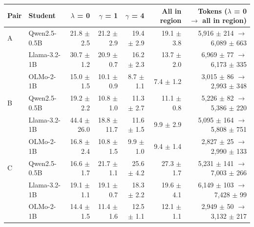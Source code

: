 \begin{tabular}{llrrrrr}
\toprule
Pair & Student & $\lambda$ = 0 & $\gamma$ = 1 & $\gamma$ = 4 & All in region & Tokens ($\lambda$ = 0 $\rightarrow$ all in region) \\
\midrule
A & Qwen2.5-0.5B & 21.8 $\pm$ 2.5 & 21.2 $\pm$ 2.9 & 19.4 $\pm$ 2.9 & 19.1 $\pm$ 3.8 & 5,916 $\pm$ 214 $\rightarrow$ 6,089 $\pm$ 663 \\
 & Llama-3.2-1B & 30.7 $\pm$ 1.2 & 20.9 $\pm$ 0.7 & 16.2 $\pm$ 2.3 & 13.7 $\pm$ 2.0 & 6,969 $\pm$ 77 $\rightarrow$ 6,173 $\pm$ 335 \\
 & OLMo-2-1B & 15.0 $\pm$ 1.5 & 10.1 $\pm$ 0.9 & 8.7 $\pm$ 1.1 & 7.4 $\pm$ 1.2 & 3,015 $\pm$ 86 $\rightarrow$ 2,993 $\pm$ 348 \\
\midrule
B & Qwen2.5-0.5B & 19.2 $\pm$ 2.2 & 10.8 $\pm$ 1.0 & 11.3 $\pm$ 2.7 & 11.1 $\pm$ 0.8 & 5,226 $\pm$ 82 $\rightarrow$ 5,386 $\pm$ 220 \\
 & Llama-3.2-1B & 44.4 $\pm$ 26.0 & 18.8 $\pm$ 11.7 & 11.6 $\pm$ 1.5 & 9.9 $\pm$ 2.9 & 5,095 $\pm$ 164 $\rightarrow$ 5,808 $\pm$ 751 \\
 & OLMo-2-1B & 16.8 $\pm$ 2.4 & 10.8 $\pm$ 1.5 & 9.9 $\pm$ 1.0 & 9.4 $\pm$ 1.4 & 2,827 $\pm$ 25 $\rightarrow$ 2,990 $\pm$ 133 \\
\midrule
C & Qwen2.5-0.5B & 16.6 $\pm$ 1.7 & 21.7 $\pm$ 1.1 & 25.6 $\pm$ 4.2 & 27.3 $\pm$ 1.7 & 5,231 $\pm$ 141 $\rightarrow$ 7,003 $\pm$ 266 \\
 & Llama-3.2-1B & 19.1 $\pm$ 1.1 & 19.1 $\pm$ 0.7 & 18.3 $\pm$ 2.2 & 19.6 $\pm$ 4.1 & 6,149 $\pm$ 103 $\rightarrow$ 7,428 $\pm$ 99 \\
 & OLMo-2-1B & 14.4 $\pm$ 1.5 & 11.4 $\pm$ 1.6 & 12.5 $\pm$ 1.1 & 12.1 $\pm$ 1.1 & 2,949 $\pm$ 50 $\rightarrow$ 3,132 $\pm$ 217 \\
\bottomrule
\end{tabular}
